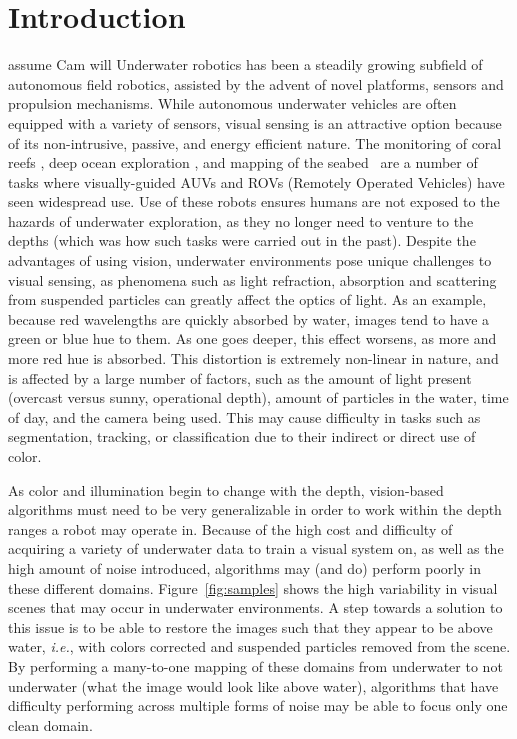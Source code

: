 \section{Introduction}
assume Cam will
Underwater robotics has been a steadily growing subfield of autonomous field robotics, assisted by the advent of novel platforms,
sensors and propulsion mechanisms. While autonomous underwater vehicles are often equipped with a variety of sensors, visual 
sensing is an
attractive option because of its non-intrusive, passive, and energy efficient nature. The monitoring of coral reefs 
\cite{shkurti2012multi},
deep ocean exploration \cite{whitcomb2000advances}, and mapping of the seabed~\cite{bingham2010robotic} are a number of tasks 
where
visually-guided AUVs and ROVs (Remotely Operated Vehicles) have seen widespread use. Use of these robots ensures humans are not 
exposed to
the hazards of underwater exploration, as they no longer need to venture to the depths (which was how such tasks were carried out 
in the
past). Despite the advantages of using vision, underwater environments pose unique challenges to visual sensing, as phenomena such 
as light
refraction, absorption and scattering from suspended particles can greatly affect the optics of light. As an example, because red
wavelengths are quickly absorbed by water, images tend to have a green or blue hue to them. As one goes deeper, this effect 
worsens, as more
and more red hue is absorbed. This distortion is extremely non-linear in nature, and is affected by a large number of factors, 
such as the
amount of light present (overcast versus sunny, operational depth), amount of particles in the water, time of day, and the camera 
being
used. This may cause difficulty in tasks such as segmentation, tracking, or classification due to their indirect or direct use of 
color.

As color and illumination begin to change with the depth, vision-based algorithms must need to be very generalizable in order to 
work within
the depth ranges a robot may operate in. Because of the high cost and difficulty of acquiring a variety of underwater data to 
train a visual
system on, as well as the high amount of noise introduced, algorithms may (and do) perform poorly in these different
domains. Figure~\ref{fig:samples} shows the high variability in visual scenes that may occur in
underwater environments. A step towards a solution to this issue is to be able to restore the images such that they appear to be 
above
water, \emph{i.e.}, with colors corrected and suspended particles removed from the scene. By performing a many-to-one mapping of 
these
domains from underwater to not underwater (what the image would look like above water), algorithms that have difficulty performing 
across
multiple forms of noise may be able to focus only one clean domain.


